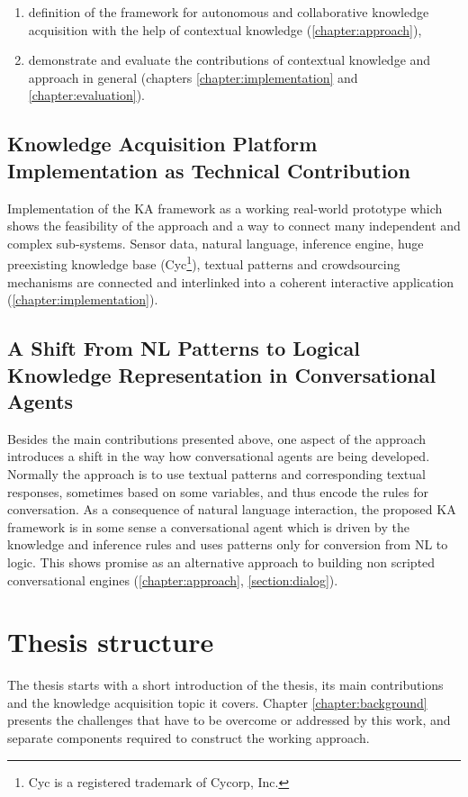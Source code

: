 \begin{enumerate}
\item definition of the framework for autonomous and collaborative knowledge 
acquisition with the help of contextual knowledge (\autoref{chapter:approach}), 
\item demonstrate and evaluate the contributions of contextual knowledge and 
approach in general (chapters \ref{chapter:implementation} and 
\ref{chapter:evaluation}).
\end{enumerate}

\subsection{Knowledge Acquisition Platform Implementation as Technical 
Contribution }
Implementation of the KA framework as a working real-world prototype which 
shows the feasibility of the approach and a way to connect many independent and 
complex sub-systems. Sensor data, natural language, inference engine, 
huge preexisting knowledge base (Cyc\footnote{Cyc is a registered trademark 
of Cycorp, Inc.})\parencite{Lenat1995}, textual patterns 
and crowdsourcing mechanisms are connected and interlinked into a coherent 
interactive application (\autoref{chapter:implementation}).

\subsection{A Shift From NL Patterns to Logical Knowledge Representation in 
Conversational Agents}
Besides the main contributions presented above, one aspect of the approach 
introduces a shift in the way how conversational agents are being developed. 
Normally the approach is to use textual patterns and corresponding textual 
responses, sometimes based on some variables, and thus encode the rules for 
conversation. As a consequence of natural language interaction, the proposed 
KA framework is in some sense a conversational agent which is driven by the 
knowledge and inference rules and uses patterns only for conversion from 
NL to logic. This shows promise as an alternative approach to building non 
scripted conversational engines (\autoref{chapter:approach}, 
\autoref{section:dialog}).

\section{Thesis structure}
The thesis starts with a short introduction of the thesis, its main 
contributions and the knowledge acquisition topic it covers. 
Chapter \ref{chapter:background} presents the challenges that have to be overcome
or addressed by this work, and separate components required to construct the 
working approach.

